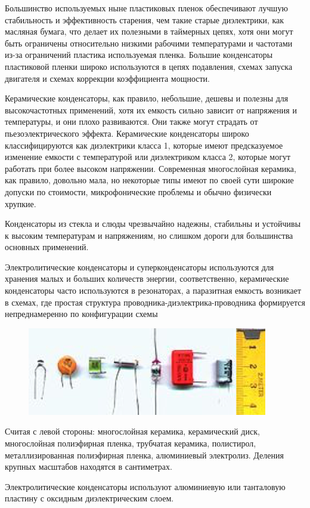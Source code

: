 Большинство используемых ныне пластиковых пленок обеспечивают лучшую стабильность и эффективность старения, чем такие старые диэлектрики, как масляная бумага, что делает их полезными в таймерных цепях, хотя они могут быть ограничены относительно низкими рабочими температурами и частотами из-за ограничений пластика используемая пленка. Большие конденсаторы пластиковой пленки широко используются в цепях подавления, схемах запуска двигателя и схемах коррекции коэффициента мощности.

Керамические конденсаторы, как правило, небольшие, дешевы и полезны для высокочастотных применений, хотя их емкость сильно зависит от напряжения и температуры, и они плохо развиваются. Они также могут страдать от пьезоэлектрического эффекта. Керамические конденсаторы широко классифицируются как диэлектрики класса 1, которые имеют предсказуемое изменение емкости с температурой или диэлектриком класса 2, которые могут работать при более высоком напряжении. Современная многослойная керамика, как правило, довольно мала, но некоторые типы имеют по своей сути широкие допуски по стоимости, микрофонические проблемы и обычно физически хрупкие.

Конденсаторы из стекла и слюды чрезвычайно надежны, стабильны и устойчивы к высоким температурам и напряжениям, но слишком дороги для большинства основных применений.

Электролитические конденсаторы и суперконденсаторы используются для хранения малых и больших количеств энергии, соответственно, керамические конденсаторы часто используются в резонаторах, а паразитная емкость возникает в схемах, где простая структура проводника-диэлектрика-проводника формируется непреднамеренно по конфигурации схемы

\begin{figure}[h!]
	\centering
	\includegraphics[width=.4\textwidth]{images/1.png}
\end{figure}

Считая с левой стороны: многослойная керамика, керамический диск, многослойная полиэфирная пленка, трубчатая керамика, полистирол, металлизированная полиэфирная пленка, алюминиевый электролиз. Деления крупных масштабов находятся в сантиметрах.

Электролитические конденсаторы используют алюминиевую или танталовую пластину с оксидным диэлектрическим слоем. 

